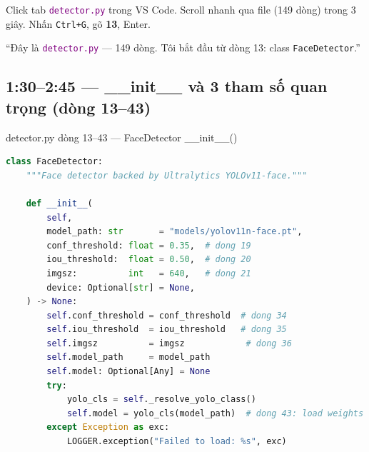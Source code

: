 \documentclass[12pt, a4paper]{article}
\newcommand{\fpath}[1]{\texttt{\textcolor{purple}{#1}}}
\begin{document}
\begin{doact}
Click tab \fpath{detector.py} trong VS Code.
Scroll nhanh qua file (149 dòng) trong 3 giây.
Nhấn \texttt{Ctrl+G}, gõ \textbf{13}, Enter.
\end{doact}

\begin{say}
``Đây là \fpath{detector.py} --- 149 dòng.
Tôi bắt đầu từ dòng 13: class \texttt{FaceDetector}.''
\end{say}

\subsection{1:30--2:45 --- \_\_init\_\_ và 3 tham số quan trọng (dòng 13--43)}

\begin{code}{detector.py dòng 13--43 --- FaceDetector \_\_init\_\_()}
\begin{lstlisting}[language=Python, firstnumber=13]
class FaceDetector:
    """Face detector backed by Ultralytics YOLOv11-face."""

    def __init__(
        self,
        model_path: str       = "models/yolov11n-face.pt",
        conf_threshold: float = 0.35,  # dong 19
        iou_threshold:  float = 0.50,  # dong 20
        imgsz:          int   = 640,   # dong 21
        device: Optional[str] = None,
    ) -> None:
        self.conf_threshold = conf_threshold  # dong 34
        self.iou_threshold  = iou_threshold   # dong 35
        self.imgsz          = imgsz            # dong 36
        self.model_path     = model_path
        self.model: Optional[Any] = None
        try:
            yolo_cls = self._resolve_yolo_class()
            self.model = yolo_cls(model_path)  # dong 43: load weights
        except Exception as exc:
            LOGGER.exception("Failed to load: %s", exc)
\end{lstlisting}
\end{code}
\end{document}
